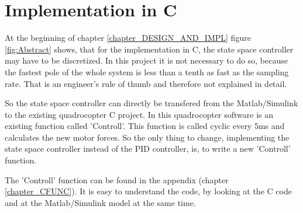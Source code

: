 \section{Implementation in C}\label{chapter_IMPLC}

At the beginning of chapter \ref{chapter_DESIGN_AND_IMPL} figure \ref{fig:Abstract} shows, that for the implementation in C, the state space controller may have to be discretized. In this project it is not necessary to do so, because the fastest pole of the whole system is less than a tenth as fast as the sampling rate. That is an engineer's rule of thumb and therefore not explained in detail.

So the state space controller can directly be transfered from the Matlab/Simulink to the existing quadrocopter C project. In this quadrocopter software is an existing function called 'Controll'. This function is called cyclic every 5ms and calculates the new motor forces. So the only thing to change, implementing the state space controller instead of the PID controller, is, to write a new 'Controll' function.

The 'Controll' function can be found in the appendix (chapter \ref{chapter_CFUNC}). It is easy to understand the code, by looking at the C code and at the Matlab/Simulink model at the same time.

